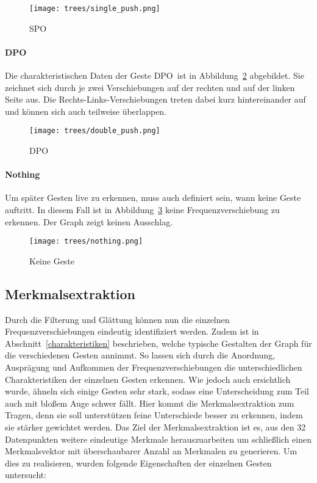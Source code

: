 \begin{figure}[htbp] \centering
\texttt{[image: trees/single\_push.png]}
\caption{\acl{SPO}}
\label{fig:single_push}
\end{figure}

\paragraph*{\acl{DPO}}
Die charakteristischen Daten der Geste \glqq \acl{DPO}\grqq\ ist in Abbildung~\ref{fig:double_push} abgebildet. Sie zeichnet sich durch je zwei Verschiebungen auf der rechten und auf der linken Seite aus. Die Rechts-Links-Verschiebungen treten dabei kurz hintereinander auf und können sich auch teilweise überlappen. 

\begin{figure}[htbp] \centering
\texttt{[image: trees/double\_push.png]}
\caption{\acl{DPO}}
\label{fig:double_push}
\end{figure}

\paragraph*{Nothing}
Um später Gesten live zu erkennen, muss auch definiert sein, wann keine Geste auftritt. In diesem Fall ist in Abbildung~\ref{fig:nothing} keine Frequenzverschiebung zu erkennen. Der Graph zeigt keinen Ausschlag.

\begin{figure}[htbp] \centering
\texttt{[image: trees/nothing.png]}
\caption{Keine Geste}
\label{fig:nothing}
\end{figure}

\subsection{Merkmalsextraktion}
Durch die Filterung und Glättung können nun die einzelnen Frequenzverschiebungen eindeutig identifiziert werden. Zudem ist in Abschnitt~\ref{charakteristiken} beschrieben, welche typische Gestalten der Graph für die verschiedenen Gesten annimmt. So lassen sich durch die Anordnung, Ausprägung und Aufkommen der Frequenzverschiebungen die unterschiedlichen Charakteristiken der einzelnen Gesten erkennen. Wie jedoch auch ersichtlich wurde, ähneln sich einige Gesten sehr stark, sodass eine Unterscheidung zum Teil auch mit bloßem Auge schwer fällt. Hier kommt die Merkmalsextraktion zum Tragen, denn sie soll unterstützen feine Unterschiede besser zu erkennen, indem sie stärker gewichtet werden. Das Ziel der Merkmalsextraktion ist es, aus den 32 Datenpunkten weitere eindeutige Merkmale herauszuarbeiten um schließlich einen Merkmalsvektor mit überschaubarer Anzahl an Merkmalen zu generieren. Um dies zu realisieren, wurden folgende Eigenschaften der einzelnen Gesten untersucht:

